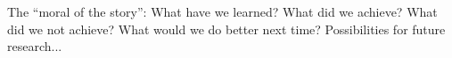 \documentclass[11pt]{article}       %
\begin{document}
The ``moral of the story'': What have we learned? What did we achieve?
What did we not achieve? What would we do better next time? Possibilities
for future research...



\end{document}
